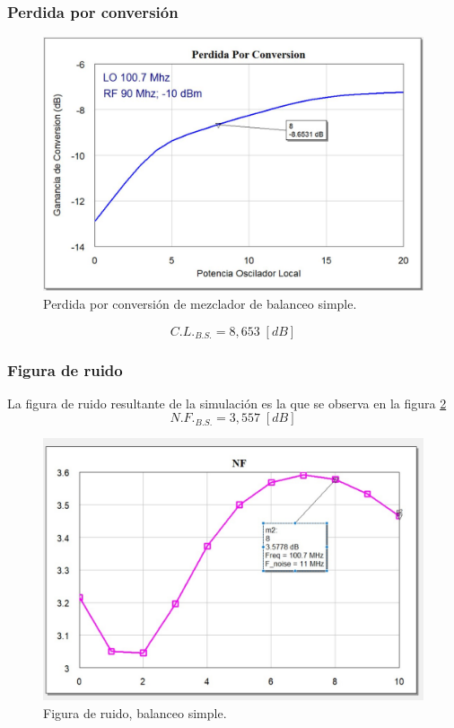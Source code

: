 \documentclass[twocolumn]{article}
\begin{document}
\subsubsection{Perdida por conversión}
%
\begin{figure}[H]
  \centering    
	\includegraphics[scale=0.35]{imagenes/CL2.jpg}
	\caption{Perdida por conversión de mezclador de balanceo simple.}\label{fig:CL2}
\end{figure}
\[C.L._{B.S.} = 8,653 \; [dB] \]
%
\subsubsection{Figura de ruido}
%
La figura de ruido resultante de la simulación es la que se observa en la figura \textcolor{blue}{\ref{fig:FN2}}
\[N.F._{B.S.} = 3,557 \; [dB] \]
\begin{figure}[H]
  \centering    
	\includegraphics[scale=0.35]{imagenes/FN2}
	\caption{Figura de ruido, balanceo simple.}\label{fig:FN2}
\end{figure}
%
\end{document}
